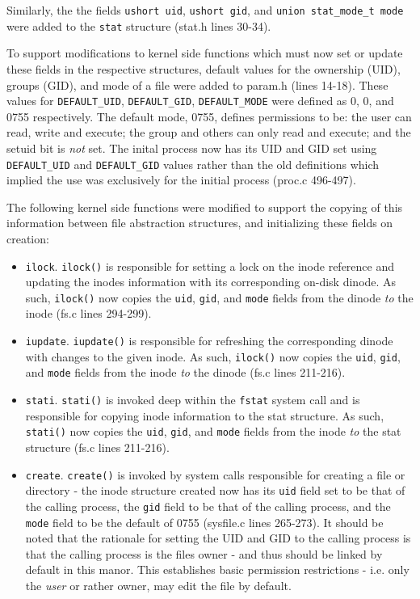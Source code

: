 \documentclass[11pt,letterpaper]{report}
\begin{document}
	Similarly, the the fields {\tt ushort uid}, {\tt ushort gid}, and {\tt union stat\_mode\_t mode} were added to the {\tt stat} structure (stat.h lines 30-34).
	
	To support modifications to kernel side functions which must now set or update these fields in the respective structures, default values for the ownership (UID), groups (GID), and mode
	of a file were added to param.h (lines 14-18). These values for {\tt DEFAULT\_UID}, {\tt DEFAULT\_GID}, {\tt DEFAULT\_MODE}  were defined as 0, 0, and 0755 respectively. The default
	mode, 0755, defines permissions to be: the user can read, write and execute; the group and others can only read and execute; and the setuid bit is \emph{not} set. The inital
	process now has its UID and GID set using {\tt DEFAULT\_UID} and {\tt DEFAULT\_GID} values rather than the old definitions which implied the use was exclusively for the
	initial process (proc.c 496-497).
	
	The following kernel side functions were modified to support the copying of this information between file abstraction structures, and initializing these fields on creation:
	\begin{itemize}
		
		\item {\tt ilock}. {\tt ilock()} is responsible for setting a lock on the inode reference and updating the inodes information with its corresponding on-disk dinode. As such, 
			{\tt ilock()} now copies the {\tt uid}, {\tt gid}, and {\tt mode} fields from the dinode \emph{to} the inode (fs.c lines 294-299).
		\item {\tt iupdate}. {\tt iupdate()} is responsible for refreshing the corresponding dinode with changes to the given inode. As such, {\tt ilock()} now copies 
			the {\tt uid}, {\tt gid}, and {\tt mode} fields from the inode \emph{to} the dinode (fs.c lines 211-216).
		\item {\tt stati}. {\tt stati()} is invoked deep within the {\tt fstat} system call and is responsible for copying inode information to the stat structure. As such, {\tt stati()} now copies 
			the {\tt uid}, {\tt gid}, and {\tt mode} fields from the inode \emph{to} the stat structure (fs.c lines 211-216).
		\item {\tt create}. {\tt create()} is invoked by system calls responsible for creating a file or directory - the inode structure created now has its {\tt uid} field set to be that of the calling
			process, the {\tt gid} field to be that of the calling process, and the {\tt mode} field to be the default of 0755 (sysfile.c lines 265-273). It should be noted that the rationale for
			setting the UID and GID to the calling process is that the calling process is the files owner - and thus should be linked by default in this manor. This establishes basic permission
			restrictions - i.e. only the \emph{user} or rather owner, may edit the file by default.
	
	

	\end{itemize} 
	
\end{document}
